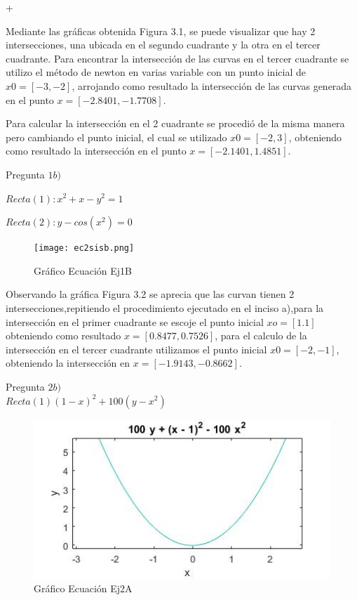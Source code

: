 +\documentclass{udpreport}
\begin{document}
\begin{enumerate}
            
            Mediante las gráficas obtenida Figura 3.1, se puede visualizar que hay 2 intersecciones, una ubicada en el segundo cuadrante y la otra en el tercer cuadrante. Para encontrar la intersección de las curvas en el tercer cuadrante se utilizo el método de newton en varias variable con un punto inicial de $x0=[-3,-2]$, arrojando como resultado la intersección de las curvas generada en el punto $x=[-2.8401,-1.7708]$.\par Para calcular la intersección en el 2 cuadrante se procedió de la misma manera pero cambiando el punto inicial, el cual se utilizado  $x0=[-2,3]$, obteniendo como resultado la intersección en el punto $x=[-2.1401,1.4851]$.

        Pregunta $ 1b)$
        
            $ Recta(1) : x^2 + x -y^2=1 $
            
            $ Recta(2) : y-cos(x^2)=0  $
            \begin{figure}[h]
                \centering
                \texttt{[image: ec2sisb.png]}
                 \caption{Gráfico Ecuación Ej1B}
            \end{figure}
            
         Observando la gráfica Figura 3.2 se aprecia que las curvan tienen 2 intersecciones,repitiendo el procedimiento ejecutado en el inciso a),para la intersección en el primer cuadrante se escoje el punto inicial $xo=[1.1] $ obteniendo como resultado $x=[0.8477,0.7526]$, para el calculo de la intersección en el tercer cuadrante utilizamos el punto inicial $x0=[-2,-1]$, obteniendo la intersección en $x=[-1.9143,-0.8662]$.
            
        Pregunta $ 2b) $\\
        
            
            $ Recta(1) (1-x)^2+100(y-x^2)$
                       
            \begin{figure}[h]
                \centering
                \includegraphics[width=15cm]{mnt2a.jpg}
                 \caption{Gráfico Ecuación Ej2A}
            \end{figure}
            

\end{enumerate}
\end{document}
